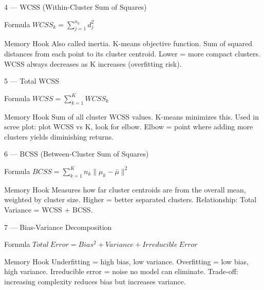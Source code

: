 \documentclass[aspectratio=169,8pt]{beamer}
\begin{document}
	\begin{frame}{4 --- WCSS (Within-Cluster Sum of Squares)}
		\begin{block}{Formula}
			$WCSS_k = \sum_{j=1}^{n_k} d_j^2$
		\end{block}
		\begin{block}{Memory Hook}
			Also called inertia. K-means objective function. Sum of squared distances from each point to its cluster centroid. Lower = more compact clusters. WCSS always decreases as K increases (overfitting risk).
		\end{block}
	\end{frame}
	
	\begin{frame}{5 --- Total WCSS}
		\begin{block}{Formula}
			$WCSS = \sum_{k=1}^{K} WCSS_k$
		\end{block}
		\begin{block}{Memory Hook}
			Sum of all cluster WCSS values. K-means minimizes this. Used in scree plot: plot WCSS vs K, look for elbow. Elbow = point where adding more clusters yields diminishing returns.
		\end{block}
	\end{frame}
	
	\begin{frame}{6 --- BCSS (Between-Cluster Sum of Squares)}
		\begin{block}{Formula}
			$BCSS = \sum_{k=1}^{K} n_k \|\mu_k - \bar{\mu}\|^2$
		\end{block}
		\begin{block}{Memory Hook}
			Measures how far cluster centroids are from the overall mean, weighted by cluster size. Higher = better separated clusters. Relationship: Total Variance = WCSS + BCSS.
		\end{block}
	\end{frame}
	
	\begin{frame}{7 --- Bias-Variance Decomposition}
		\begin{block}{Formula}
			$Total\ Error = Bias^2 + Variance + Irreducible\ Error$
		\end{block}
		\begin{block}{Memory Hook}
			Underfitting = high bias, low variance. Overfitting = low bias, high variance. Irreducible error = noise no model can eliminate. Trade-off: increasing complexity reduces bias but increases variance.
		\end{block}
	\end{frame}
	
\end{document}
